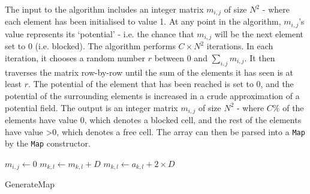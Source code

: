 \documentclass[12pt,twoside,notitlepage]{report}
\begin{document}
\noindent
The input to the algorithm includes an integer matrix $m_{i,j}$ of size $N^{2}$ - where each element has been initialised to value 1. At any point in the algorithm, $m_{i,j}$'s value represents its `potential' - i.e. the chance that $m_{i,j}$ will be the next element set to 0 (i.e. blocked). The algorithm performs $C \times N^{2}$ iterations. In each iteration, it chooses a random number $r$ between $0$ and $\sum\limits_{i,j} m_{i,j}$. It then traverses the matrix row-by-row until the sum of the elements it has seen is at least $r$. The potential of the element that has been reached is set to $0$, and the potential of the surrounding elements is increased in a crude approximation of a potential field. The output is an integer matrix $m_{i,j}$ of size $N^{2}$ - where $C\%$ of the elements have value 0, which denotes a blocked cell, and the rest of the elements have value \textgreater $0$, which denotes a free cell. The array can then be parsed into a {\tt Map} by the {\tt Map} constructor.

\begin{algorithm}[htp]
  \SetAlgoLined\DontPrintSemicolon
   
   {
    \nl $m_{i,j} \gets 0$\;
    \nl {} {
      \nl {} {
        \nl $m_{k,l} \gets m_{k,l} + D$\;
      }
  }
  \nl {} {
      \nl {} {
        $m_{k,l} \gets a_{k,l} + 2\times D$\;
      }
  }
}
\caption{{\sc GenerateMap}}
 \end{algorithm} 
 
\end{document}
